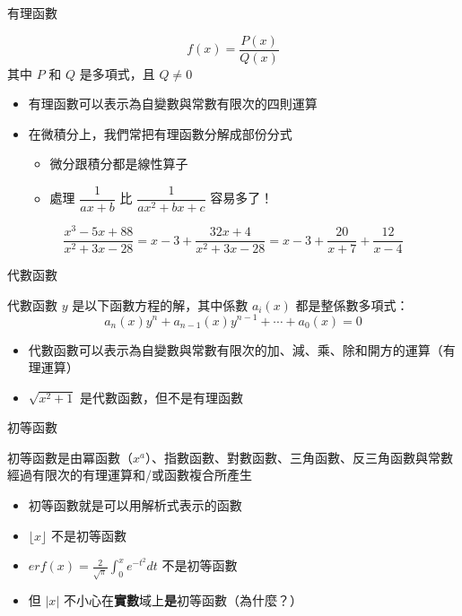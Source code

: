 \documentclass{beamer}
\begin{document}
\begin{CJK}{UTF8}{bsmi}
\begin{frame}{有理函數}
  \begin{definition}
    \[f(x) = \frac{P(x)}{Q(x)}\]
    其中 $P$ 和 $Q$ 是多項式，且 $Q \ne 0$
  \end{definition}
  \begin{itemize}
    \item 有理函數可以表示為自變數與常數有限次的四則運算
    \item 在微積分上，我們常把有理函數分解成部份分式
      \begin{itemize}
	\item 微分跟積分都是線性算子
	\item 處理 $\dfrac{1}{ax + b}$ 比 $\dfrac{1}{ax^2 + bx + c}$ 容易多了！
      \end{itemize}
  \end{itemize}

  \[\frac{x^3 - 5x + 88}{x^2 + 3x - 28} = x-3 + \frac{32x + 4}{x^2 + 3x - 28} = x-3 + \frac{20}{x+7} + \frac{12}{x-4}\]
\end{frame}

\begin{frame}{代數函數}
  \begin{definition}
    代數函數 $y$ 是以下函數方程的解，其中係數 $a_i(x)$ 都是整係數多項式：
    \[a_n(x) y^n + a_{n-1}(x) y^{n-1} + \cdots + a_0(x) = 0\]
  \end{definition}
  \begin{itemize}
    \item 代數函數可以表示為自變數與常數有限次的加、減、乘、除和開方的運算（有理運算）
    \item $\sqrt{x^2 + 1}$ 是代數函數，但不是有理函數
  \end{itemize}
\end{frame}

\begin{frame}{初等函數}
  \begin{definition}
    初等函數是由冪函數（$x^a$）、指數函數、對數函數、三角函數、反三角函數與常數經過有限次的有理運算和/或函數複合所產生
  \end{definition}
  \begin{itemize}
    \item 初等函數就是可以用解析式表示的函數
    \item $\lfloor x \rfloor$ 不是初等函數
    \item $\displaystyle erf(x) = \frac{2}{\sqrt\pi} \int_0^x e^{-t^2} dt$ 不是初等函數
    \item 但 $|x|$ 不小心在\textbf{實數}域上\textbf{是}初等函數（為什麼？）
  \end{itemize}
\end{frame}


\end{CJK}
\end{document}
